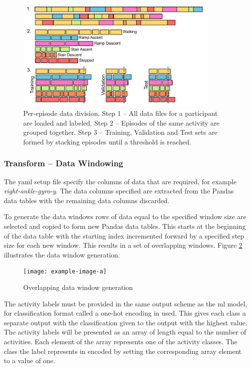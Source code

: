  \begin{figure}[!hbt]
     \centering
     \includegraphics[width=0.9\textwidth]{content/3-Methods/Episode_Division.pdf}
     \caption[Per-episode data division]{Per-episode data division. Step 1 -- All data files for a participant are loaded and labeled. Step 2 -- Episodes of the same activity are grouped together. Step 3 -- Training, Validation and Test sets are formed by stacking episodes until a threshold is reached.}
     \label{fig:methods-per-episode-data-division}
 \end{figure}
 
 
\subsubsection{Transform -- Data Windowing}
The \acrshort{yaml} setup file specify the columns of data that are required, for example \textit{right-ankle-gyro-y}. The data columns specified are extracted from the Pandas data tables with the remaining data columns discarded.

To generate the data windows rows of data equal to the specified window size are selected and copied to form new Pandas data tables. This starts at the beginning of the data table with the starting index incremented forward by a specified step size for each new window. This results in a set of overlapping windows. Figure \ref{fig:methods-data-window-generation} illustrates the data window generation.

\begin{figure}[!hbt]
    \centering
    \texttt{[image: example-image-a]}
    \caption{Overlapping data window generation}
    \label{fig:methods-data-window-generation}
\end{figure}

The activity labels must be provided in the same output scheme as the \acrshort{ml} model, for classification format called a one-hot encoding in used. This gives each class a separate output with the classification given to the output with the highest value. The activity labels will be presented as an array of length equal to the number of activities. Each element of the array represents one of the activity classes. The class the label represents in encoded by setting the corresponding array element to a value of one.

